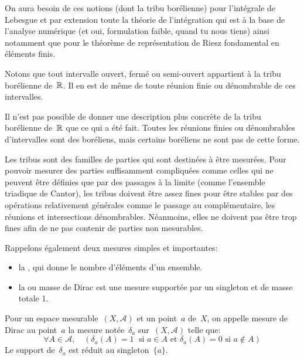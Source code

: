 On aura besoin de ces notions (dont la tribu borélienne) pour l'intégrale de Lebesgue et par extension
toute la théorie de l'intégration qui est à la base de l'analyse numérique (et oui, formulation faible, quand
tu nous tiens) ainsi notamment que pour le théorème de représentation de Riesz fondamental en
éléments finis.

\medskip
Notons que tout intervalle ouvert, fermé ou semi-ouvert appartient à la tribu borélienne de~$\mathbb R$.
Il en est de même de toute réunion finie ou dénombrable de ces intervalles.

\medskip
Il n'est pas possible de donner une description plus concrète de la tribu
borélienne de~$\mathbb R$ que ce qui a été fait. Toutes les réunions finies ou dénombrables d'intervalles 
sont des boréliens, mais certains boréliens ne sont pas de cette forme. 

\medskip
Les tribus sont des familles de parties qui sont destinées à être mesurées. Pour pouvoir
mesurer des parties suffisamment compliquées comme celles qui ne peuvent être définies
que par des passages à la limite (comme l'ensemble triadique de Cantor), 
les tribus doivent être assez fines pour être stables par des opérations relativement générales comme
le passage au complémentaire, les réunions et intersections dénombrables. Néanmoins,
elles ne doivent pas être trop fines afin de ne pas contenir de parties non mesurables.

\medskip
Rappelons également deux mesures simples et importantes:
\begin{itemize}
  \item la , qui donne le nombre d'éléments d'un ensemble.
  \item la 
	ou masse de Dirac est une mesure supportée par un singleton et de masse totale 1.
\end{itemize}

\begin{definition}
Pour un espace mesurable~$(X,\mathcal{A})$ et un point~$a$ de~$X$, on appelle mesure de Dirac au
point~$a$ la mesure notée~$\delta_a$ sur~$(X, \mathcal{A})$ telle que:
\begin{equation}
  \forall A \in \mathcal{A},\quad ( \delta_a(A)=1 \; \text{ si } a \in A \text{ et } \delta_a(A)=0  \text{ si } a \notin A )
\end{equation}
Le support de~$\delta_a$ est réduit au singleton~$\{a\}$.
\end{definition}

